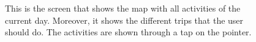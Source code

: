 \documentclass[12pt,titlepage]{article}
\begin{document}
\begin{figure}
\centering
{}
\caption{This is the screen that shows the map with all activities of the current day. Moreover, it shows the different trips that the user should do. The activities are shown through a tap on the pointer.}
\end{figure}
\clearpage
\newpage
\end{document}
